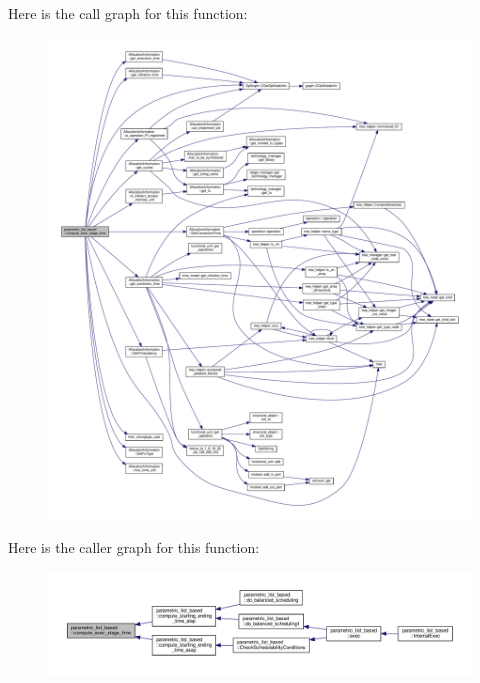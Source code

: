 Here is the call graph for this function\+:
\nopagebreak
\begin{figure}[H]
\begin{center}
\leavevmode
\includegraphics[width=350pt]{d7/d47/classparametric__list__based_a054abcf6ebfca65a3c67458cb77d7e63_cgraph}
\end{center}
\end{figure}
Here is the caller graph for this function\+:
\nopagebreak
\begin{figure}[H]
\begin{center}
\leavevmode
\includegraphics[width=350pt]{d7/d47/classparametric__list__based_a054abcf6ebfca65a3c67458cb77d7e63_icgraph}
\end{center}
\end{figure}
\mbox{\label{classparametric__list__based_aa040a68024272d93c52aed13f00881bf}} 
